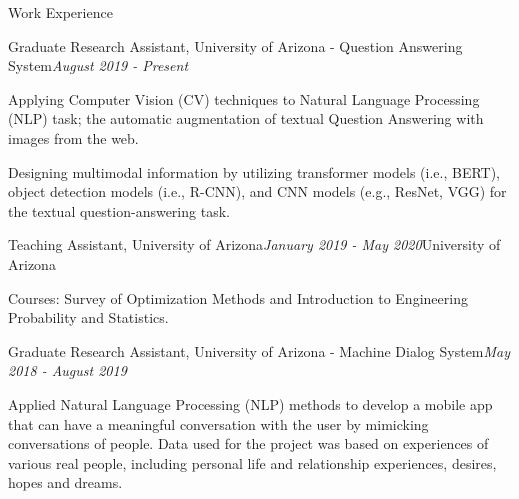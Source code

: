 \documentclass{resume} %
\begin{document}


\begin{rSection}{Work Experience}


\begin{rSubsection}{Graduate Research Assistant, University of Arizona - Question Answering System}{\em August 2019 - Present}{}{}%
\item Applying Computer Vision (CV) techniques to Natural Language Processing (NLP) task; the automatic augmentation of textual Question Answering with images from the web.



\item Designing multimodal information by utilizing transformer models (i.e., BERT), object detection models (i.e., R-CNN), and CNN models (e.g., ResNet, VGG) for the textual question-answering task.

\end{rSubsection}


\begin{rSubsection}{Teaching Assistant, University of Arizona}{\em January 2019 - May 2020}{}{University of Arizona}
\item Courses: Survey of Optimization Methods and Introduction to Engineering Probability and Statistics.
\end{rSubsection}



\begin{rSubsection}{Graduate Research Assistant, University of Arizona - Machine Dialog System}{\em May 2018 - August 2019}{}{}
\item Applied Natural Language Processing (NLP) methods to develop a mobile app that can have a meaningful conversation with the user by mimicking conversations of people. Data used for the project was based on experiences of various real people, including personal life and relationship experiences, desires, hopes and dreams. 
\end{rSubsection}



\end{rSection}
\end{document}
